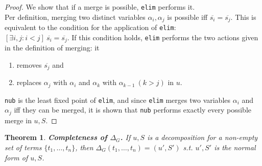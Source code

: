 \documentclass[a4paper, 11pt]{report}
\newtheorem{theorem}{Theorem}
\begin{document}
\begin{proof}
We show that if a merge is possible, \texttt{elim} performs it.\\

\noindent
Per definition, merging two distinct variables $\alpha_i, \alpha_j$ is possible iff $\overline{s_i} = \overline{s_j}$. This is equivalent to the condition for the application of \texttt{elim}:\\ $[\exists i,j: i < j]\ \overline{s_{i}} = \overline{s_{j}}$.
If this condition holds, \texttt{elim} performs the two actions given in the definition of merging: it
  \begin{enumerate}
    \item removes $\overline{s_j}$ and
    \item replaces $\alpha_j$ with $\alpha_i$ and $\alpha_k$ with $\alpha_{k-1}\ (k > j)$ in $u$.
  \end{enumerate}

\texttt{nub} is the least fixed point of \texttt{elim}, and since \texttt{elim} merges two variables $\alpha_i$ and $\alpha_j$ iff they can be merged, it is shown that \texttt{nub} performs exactly every possible merge in $u,S$.
\end{proof}

\begin{theorem}
  \textbf{Completeness of $\Delta_G$.}
  If $u,S$ is a decomposition for a non-empty set of terms $\{t_1,\dots,t_n\}$, then $\Delta_G(t_1,\dots,t_n) = (u',S')$ s.t. $u',S'$ is the normal form of $u,S$.
  \label{thm:DeltaGCompleteness}
\end{theorem}
\end{document}
